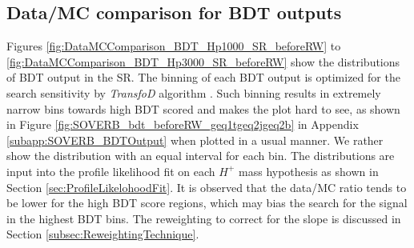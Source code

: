 \subsection{Data/MC comparison for BDT outputs}
\label{subsec:DataAndMCComparisonOfBDT}
Figures \ref{fig:DataMCComparison_BDT_Hp1000_SR_beforeRW} to \ref{fig:DataMCComparison_BDT_Hp3000_SR_beforeRW} show the distributions of BDT output in the SR. The binning of each BDT output is optimized for the search sensitivity by \textit{TransfoD} algorithm \cite{Binning-TTHFilter}. Such binning results in extremely narrow bins towards high BDT scored and makes the plot hard to see, as shown in Figure \ref{fig:SOVERB_bdt_beforeRW_geq1tgeq2jgeq2b} in Appendix \ref{subapp:SOVERB_BDTOutput} when plotted in a usual manner. We rather show the distribution with an equal interval for each bin. The distributions are input into the profile likelihood fit on each $H^{+}$ mass hypothesis as shown in Section \ref{sec:ProfileLikelohoodFit}. It is observed that the data/MC ratio tends to be lower for the high BDT score regions, which may bias the search for the signal in the highest BDT bins. The reweighting to correct for the slope is discussed in Section \ref{subsec:ReweightingTechnique}. 

